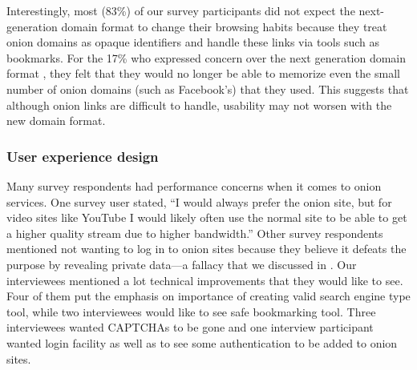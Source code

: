 Interestingly, most (83\%) of our survey participants did not expect the
next-generation domain format to change their browsing habits because they treat onion domains as
opaque identifiers and handle these links via tools such as bookmarks.  For the 17\% who expressed concern over the next generation domain format , they felt that they would no longer be able to memorize even the small
number of onion domains (such as Facebook's) that they used.
 This suggests that although onion links are difficult to handle, usability may not worsen with the new domain format.


\subsubsection{User experience design}


Many survey respondents had performance concerns when it comes to onion services.   One survey user stated, ``I would
always prefer the onion site, but for video sites like YouTube I would likely
often use the normal site to be able to get a higher quality stream due to
higher bandwidth.'' Other survey respondents mentioned not wanting to log in to onion sites
because they believe it defeats the purpose by revealing private data---a fallacy that we discussed in
.  Our interviewees mentioned a lot technical improvements that they would like to see. Four of them put the emphasis on importance of creating valid search engine type tool, while two interviewees would like to see safe bookmarking tool.  Three interviewees wanted CAPTCHAs to be gone and one interview participant wanted login facility as well as to see some authentication to be added to onion sites. 

